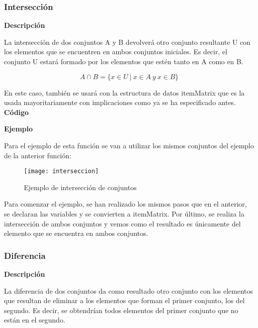 \subsubsection{Intersecci\'on}

    \textbf{Descripci\'on}
    
    La intersecci\'on de dos conjuntos A y B devolver\'a otro conjunto resultante U con los elementos 
    que se encuentren en ambos conjuntos iniciales. Es decir, el conjunto U estar\'a formado por los elementos 
    que est\'en tanto en A como en B.

    \[
        A \cap B = \{x\in U ~ | ~ x\in A ~ y ~ x\in B \}
    \]

    En este caso, tambi\'en se usar\'a con la estructura de datos itemMatrix que es la usada mayoritariamente con implicaciones 
    como ya se ha especificado antes.
    \\


    \textbf{C\'odigo}

    
    \bigskip

    \textbf{Ejemplo}

    Para el ejemplo de esta funci\'on se van a utilizar los mismos conjuntos del ejemplo de la anterior funci\'on:

    \begin{figure}[H]
        \centering
        \texttt{[image: interseccion]}
        \caption{Ejemplo de intersecci\'on de conjuntos}
        \label{fig:interseccion}
    \end{figure}

    Para comenzar el ejemplo, se han realizado los mismos pasos que en el anterior, se declaran las variables y se convierten a 
    itemMatrix. 
    Por \'ultimo, se realiza la intersecci\'on de ambos conjuntos y vemos como el resultado es \'unicamente del elemento que se encuentra 
    en ambos conjuntos.

    \clearpage

\subsubsection{Diferencia}

    \textbf{Descripci\'on}

    La diferencia de dos conjuntos da como resultado otro conjunto con los elementos que resultan de 
    eliminar a los elementos que forman el primer conjunto, los del segundo. Es decir, se obtendr\'ian 
    todos elementos del primer conjunto que no est\'an en el segundo.

